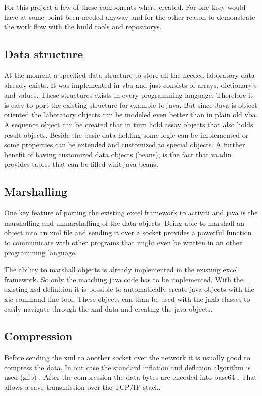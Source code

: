 \documentclass[paper=a4,twoside=false,BCOR=0mm,DIV=calc,fontsize=12pt]{scrartcl}
\begin{document}
For this project a few of these components where created. For one they would have at some point been needed anyway and for the other reason to
demonstrate the work flow with the build tools and repositorys.





\subsection{Data structure}
At the moment a specified data structure to store all the needed laboratory data already exists. It was implemented in vba and just consists of
arrays, dictionary's and values. These structures exists in every programming language. Therefore it is easy to port the existing structure for
example to java. But since Java is object oriented the laboratory objects can be modeled even better than in plain old vba. A sequence object can be
created that in turn hold assay objects that also holds result objects. Beside the basic data holding some logic can be implemented or some properties
can be extended and customized to special objects. A further benefit of having customized data objects (beans), is the fact that vaadin provides
tables that can be filled whit java beans.




\subsection{Marshalling}
One key feature of porting the existing excel framework to activiti and java is the marshalling and unmarshalling of the data objects.
Being able to marshall an object into an xml file and sending it over a socket provides a powerful function to communicate with other programs that
might even be written in an other programming language.

The ability to marshall objects is already implemented in the existing excel framework. So only the matching java code has to be implemented.
With the existing xsd definition it is possible to automatically create java objects with the xjc \cite{xjc} command line tool.
These objects can than be used with the jaxb classes to easily navigate through the xml data and creating the java objects.



\subsection{Compression}
Before sending the xml to another socket over the network it is usually good to compress the data.
In our case the standard inflation and deflation algorithm is used (zlib) \cite{zlib}. After the compression 
the data bytes are encoded into base64 \cite{base64}. That allows a save transmission over the TCP/IP stack.
\end{document}
